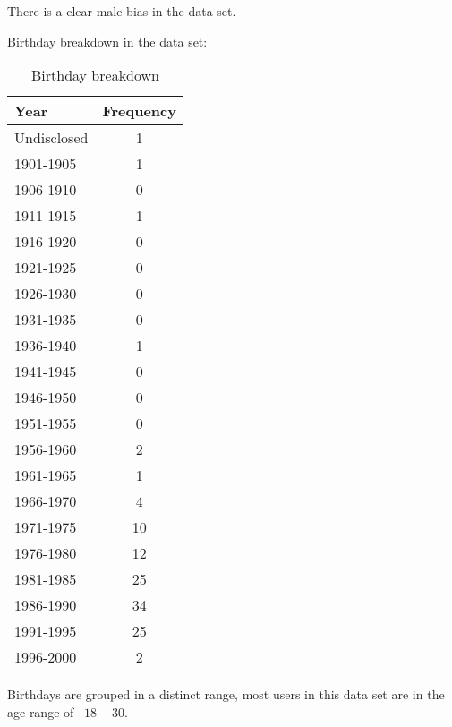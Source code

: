 There is a clear male bias in the data set.

\clearpage

Birthday breakdown in the data set:

\begin{table}[!htbp]
\centering
	\begin{tabular}{|l|c|} %
		\hline
		\textbf{Year} & \textbf{Frequency}  \\ \hline
		Undisclosed & 1 \\ \hline
		1901-1905 & 1 \\ \hline
		1906-1910 & 0 \\ \hline
		1911-1915 & 1 \\ \hline
		1916-1920 & 0 \\ \hline
		1921-1925 & 0 \\ \hline
		1926-1930 & 0 \\ \hline
		1931-1935 & 0 \\ \hline
		1936-1940 & 1 \\ \hline
		1941-1945 & 0 \\ \hline
		1946-1950 & 0 \\ \hline
		1951-1955 & 0 \\ \hline
		1956-1960 & 2 \\ \hline
		1961-1965 & 1 \\ \hline
		1966-1970 & 4 \\ \hline
		1971-1975 & 10 \\ \hline
		1976-1980 & 12 \\ \hline
		1981-1985 & 25 \\ \hline
		1986-1990 & 34 \\ \hline
		1991-1995 & 25 \\ \hline
		1996-2000 & 2 \\ \hline
	\end{tabular}
	\caption{Birthday breakdown}
	\label{tab:revpol}
\end{table}

Birthdays are grouped in a distinct range, most users in this data set are in the age range of ~\(18 - 30\).

\clearpage

